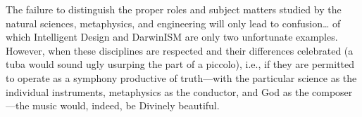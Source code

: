 The failure to distinguish the proper roles and subject matters studied by the natural sciences, metaphysics, and engineering will only lead to confusion… of which Intelligent Design and DarwinISM are only two unfortunate examples. However, when these disciplines are respected and their differences celebrated (a tuba would sound ugly usurping the part of a piccolo), i.e., if they are permitted to operate as a symphony productive of truth—with the particular science as the individual instruments, metaphysics as the conductor, and God as the composer—the music would, indeed, be Divinely beautiful.



